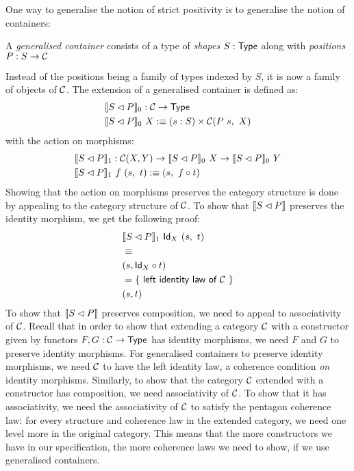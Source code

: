 \documentclass[a4paper,10pt]{article}
\begin{document}
One way to generalise the notion of strict positivity is to generalise
the notion of containers:
%
\begin{defn}
  A \emph{generalised container} consists of a type of \emph{shapes}
  $S : \mathsf{Type}$ along with \emph{positions} $P : S \to \mathcal{C}$
\end{defn}
%
Instead of the positions being a family of types indexed by $S$, it is
now a family of objects of $\mathcal{C}$. The extension of a generalised
container is defined as:
%
\begin{align*}
  &\llbracket S \lhd P \rrbracket_0 : \mathcal{C} \to \mathsf{Type} \\
  &\llbracket S \lhd P \rrbracket_0 \ X :\equiv (s : S) \times \mathcal{C}(P \ s,\ X)
\end{align*}
%
with the action on morphisms:
%
\begin{align*}
  &\llbracket S \lhd P \rrbracket_1 : \mathcal{C}(X , Y) \to \llbracket S \lhd P \rrbracket_0 \ X \to \llbracket S \lhd P \rrbracket_0 \ Y \\
  &\llbracket S \lhd P \rrbracket_1 \ f \ (s ,\ t) :\equiv (s ,\ f \circ t)
\end{align*}
%
Showing that the action on morphisms preserves the category structure
is done by appealing to the category structure of $\mathcal{C}$. To show that
$\llbracket S \lhd P \rrbracket$ preserves the identity morphism, we get the following
proof:
%
\begin{align*}
&\llbracket S \lhd P \rrbracket_1 \ \mathsf{Id}_{X} \ (s ,\ t) \\
&\equiv \\
&(s , \mathsf{Id}_{X} \circ t) \\
&= \{\ \textsf{left identity law of $\mathcal{C}$}\ \} \\
&(s, t)
\end{align*}
%
To show that $\llbracket S \lhd P \rrbracket$ preserves composition, we need to appeal to
associativity of $\mathcal{C}$. Recall that in order to show that extending a
category $\mathcal{C}$ with a constructor given by functors
$F, G : \mathcal{C} \to \mathsf{Type}$ has identity morphisms, we need $F$ and $G$ to
preserve identity morphisms. For generalised containers to preserve
identity morphisms, we need $\mathcal{C}$ to have the left identity law, a
coherence condition \emph{on} identity morphisms. Similarly, to show
that the category $\mathcal{C}$ extended with a constructor has composition, we
need associativity of $\mathcal{C}$. To show that it has associativity, we need
the associativity of $\mathcal{C}$ to satisfy the pentagon coherence law: for
every structure and coherence law in the extended category, we need
one level more in the original category. This means that the more
constructors we have in our specification, the more coherence laws we
need to show, if we use generalised containers.
\end{document}
